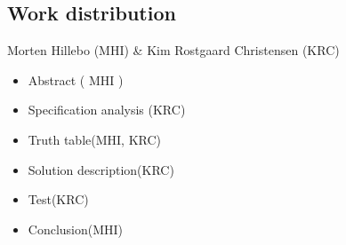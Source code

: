 \subsection{Work distribution}
Morten Hillebo (MHI) \& Kim Rostgaard Christensen (KRC)
\begin{itemize}
\item Abstract ( MHI )
\item Specification analysis (KRC)
\item Truth table(MHI, KRC)
\item Solution description(KRC)
\item Test(KRC)
\item Conclusion(MHI)
\end{itemize}

